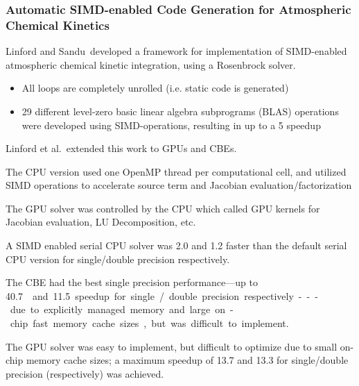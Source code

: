 \documentclass{beamer}
\newcounter{dummynote1}%
\newcounter{dummynote2}%
\begin{document}
\begin{frame}
 \frametitle{Automatic SIMD-enabled Code Generation for Atmospheric Chemical Kinetics}
 \setcounter{dummynote1}{\value{footnote}}
 \setcounter{dummynote2}{\value{footnote}}
 \addtocounter{dummynote1}{1}
 \addtocounter{dummynote2}{2}
 {
  Linford and Sandu\footnotemark[\value{dummynote1}]~developed a framework for implementation of SIMD-enabled atmospheric chemical kinetic integration, using a Rosenbrock solver.
 \begin{itemize}
  \item All loops are completely unrolled (i.e. static code is generated)
  \item 29 different level-zero basic linear algebra subprograms (BLAS) operations were developed using SIMD-operations, resulting in up to a \SI{5}{\times} speedup
 \end{itemize}
 }
 Linford et al.\footnotemark[\value{dummynote2}]~extended this work to GPUs and CBEs.
 \begin{itemize}
  {
  \item The CPU version used one OpenMP thread per computational cell, and utilized SIMD operations to accelerate source term and Jacobian evaluation\slash factorization
  \item The GPU solver was controlled by the CPU which called GPU kernels for Jacobian evaluation, LU Decomposition, etc.
  }
  {
  \item<2-> A SIMD enabled serial CPU solver was \SI{2.0}{\times} and \SI{1.2}{\times} faster than the default serial CPU version for single\slash double precision respectively.
  \item<2-> The CBE had the best single precision performance---up to \SI{40.7}\times and \SI{11.5}{\times} speedup for single\slash double precision respectively---due to explicitly managed memory and large on-chip fast memory cache sizes, but was difficult to implement.
  \item<2-> The GPU solver was easy to implement, but difficult to optimize due to small on-chip memory cache sizes; a maximum speedup of \SI{13.7}{\times} and \SI{13.3}{\times} for single\slash double precision (respectively) was achieved.
  }
 \end{itemize}
 {
 }
 \setcounter{footnote}{\value{dummynote2}} %
\end{frame}
\end{document}
